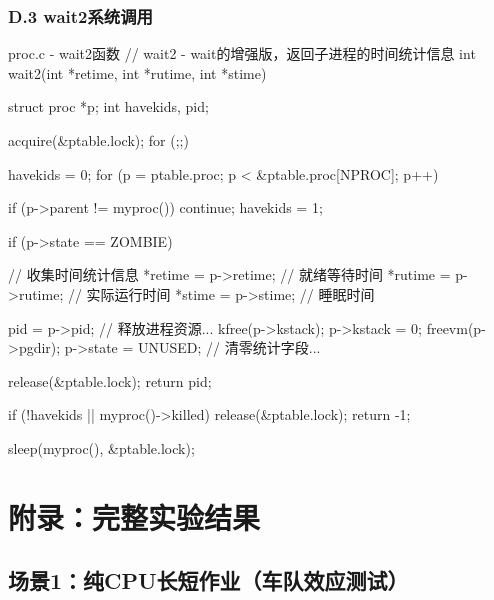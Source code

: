 \documentclass[a4paper, 12pt]{article}
\begin{document}
    \subsubsection{D.3 wait2系统调用}
    
    \begin{codeblock}{proc.c - wait2函数}
// wait2 - wait的增强版，返回子进程的时间统计信息
int wait2(int *retime, int *rutime, int *stime) {
    struct proc *p;
    int havekids, pid;
    
    acquire(&ptable.lock);
    for (;;) {
        havekids = 0;
        for (p = ptable.proc; p < &ptable.proc[NPROC]; p++) {
            if (p->parent != myproc()) continue;
            havekids = 1;
            
            if (p->state == ZOMBIE) {
                // 收集时间统计信息
                *retime = p->retime;  // 就绪等待时间
                *rutime = p->rutime;  // 实际运行时间
                *stime = p->stime;    // 睡眠时间
                
                pid = p->pid;
                // 释放进程资源...
                kfree(p->kstack);
                p->kstack = 0;
                freevm(p->pgdir);
                p->state = UNUSED;
                // 清零统计字段...
                
                release(&ptable.lock);
                return pid;
            }
        }
        
        if (!havekids || myproc()->killed) {
            release(&ptable.lock);
            return -1;
        }
        
        sleep(myproc(), &ptable.lock);
    }
}
    \end{codeblock}
    
\section{附录：完整实验结果}\label{appendix:full-results}

\subsection{场景1：纯CPU长短作业（车队效应测试）}
\end{document}

